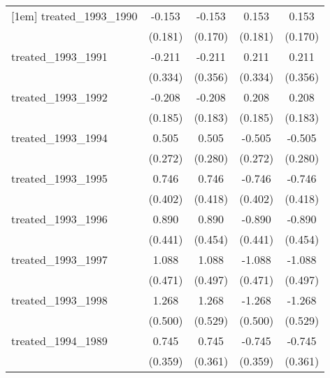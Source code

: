 {\begin{tabular}{l*{4}{c}}
[1em]
treated\_1993\_1990&      -0.153         &      -0.153         &       0.153         &       0.153         \\
            &     (0.181)         &     (0.170)         &     (0.181)         &     (0.170)         \\
[1em]
treated\_1993\_1991&      -0.211         &      -0.211         &       0.211         &       0.211         \\
            &     (0.334)         &     (0.356)         &     (0.334)         &     (0.356)         \\
[1em]
treated\_1993\_1992&      -0.208         &      -0.208         &       0.208         &       0.208         \\
            &     (0.185)         &     (0.183)         &     (0.185)         &     (0.183)         \\
[1em]
treated\_1993\_1994&       0.505         &       0.505         &      -0.505         &      -0.505         \\
            &     (0.272)         &     (0.280)         &     (0.272)         &     (0.280)         \\
[1em]
treated\_1993\_1995&       0.746         &       0.746         &      -0.746         &      -0.746         \\
            &     (0.402)         &     (0.418)         &     (0.402)         &     (0.418)         \\
[1em]
treated\_1993\_1996&       0.890\sym{*}  &       0.890\sym{*}  &      -0.890\sym{*}  &      -0.890\sym{*}  \\
            &     (0.441)         &     (0.454)         &     (0.441)         &     (0.454)         \\
[1em]
treated\_1993\_1997&       1.088\sym{*}  &       1.088\sym{*}  &      -1.088\sym{*}  &      -1.088\sym{*}  \\
            &     (0.471)         &     (0.497)         &     (0.471)         &     (0.497)         \\
[1em]
treated\_1993\_1998&       1.268\sym{*}  &       1.268\sym{*}  &      -1.268\sym{*}  &      -1.268\sym{*}  \\
            &     (0.500)         &     (0.529)         &     (0.500)         &     (0.529)         \\
[1em]
treated\_1994\_1989&       0.745\sym{*}  &       0.745\sym{*}  &      -0.745\sym{*}  &      -0.745\sym{*}  \\
            &     (0.359)         &     (0.361)         &     (0.359)         &     (0.361)         \\

\end{tabular}}
